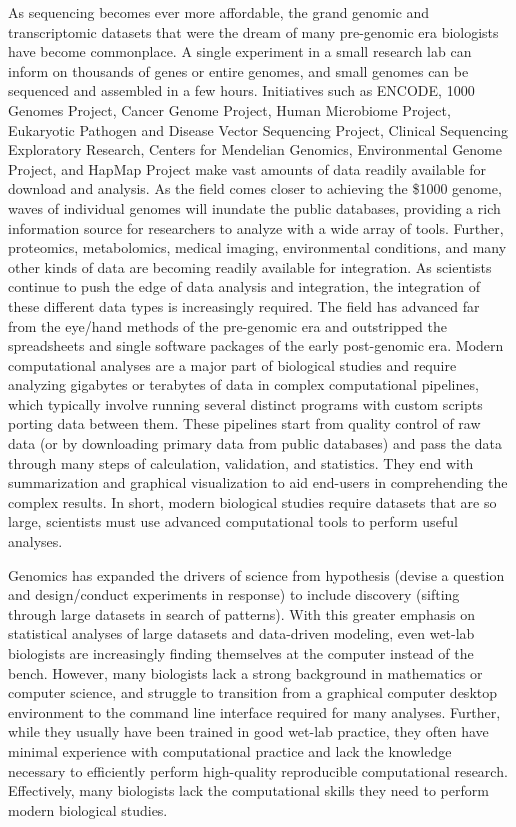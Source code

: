 \documentclass[ChapterTOCs,krantz2]{krantz} %
\begin{document}
As sequencing becomes ever more affordable,
the grand genomic and transcriptomic datasets that were the
dream of many pre-genomic era biologists have become commonplace.  A single
experiment in a small research lab can inform on
thousands of genes or entire genomes, and small genomes can be sequenced and assembled in a few hours.
Initiatives such as ENCODE\cite{Encode2004,Myers2011}, 
1000 Genomes Project\cite{Altshuler2010}, 
Cancer Genome Project\cite{Cosmic2011}, Human Microbiome Project\cite{Lewis2012}, 
Eukaryotic Pathogen and Disease Vector Sequencing Project\cite{EPDVSP}, 
Clinical Sequencing Exploratory Research\cite{CSER}, 
Centers for Mendelian Genomics\cite{CMG}, Environmental Genome Project\cite{EGP}, 
and HapMap Project\cite{IHP} make vast amounts of data readily available for
download and analysis.
As the field comes closer to achieving the 
\$1000 genome\cite{Mardis2006}, waves of individual genomes will inundate the 
public databases, providing a rich information source for
researchers to analyze with a wide array of tools.  Further,
proteomics, metabolomics, medical imaging, environmental conditions, and many
other kinds of data are becoming readily available for integration.  As
scientists continue to push the edge of data analysis and integration, the integration of these
different data types is increasingly required.  The field has
advanced far from the eye/hand methods of the pre-genomic era and outstripped
the spreadsheets and single software packages of the early post-genomic era.  
Modern computational analyses are a major part of biological studies \cite{Zhulin2009}
and require analyzing gigabytes or terabytes of data in complex computational
pipelines, which typically involve running several distinct programs with custom
scripts porting data between them.  These pipelines start from quality control of 
raw data (or by downloading primary data from public databases) and pass the data 
through many steps of calculation, validation, and statistics.  They end with
summarization and graphical visualization to aid end-users in comprehending the
complex results.  In short, modern biological studies require 
datasets that are so large, scientists must use advanced computational tools to 
perform useful analyses.

Genomics has expanded the drivers of science from hypothesis (devise a question 
and design/conduct experiments in response) to include discovery (sifting through large datasets in search of patterns).  With this greater emphasis
on statistical analyses of large datasets and data-driven modeling, even wet-lab biologists are
increasingly finding themselves at the computer instead of the bench\cite{Merali2010}.  
However, many biologists lack a strong background in mathematics or
computer science\cite{Bialek2004,Pevzner2009}, 
and struggle to transition from a graphical
computer desktop environment to the command line interface required for
many analyses.  Further, while they
usually have been trained in good wet-lab practice,
they often have minimal experience with computational 
practice and lack the knowledge necessary to 
efficiently perform high-quality reproducible 
computational research\cite{Merali2010,Segal2007}.
Effectively, many biologists lack the computational skills they need to perform 
modern biological studies.
\end{document}
